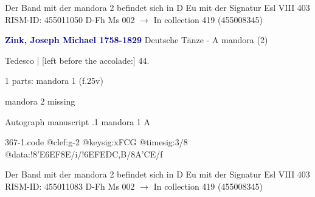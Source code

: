 \documentclass[twocolumn]{book}
\begin{document}
\newline Der Band mit der mandora 2 befindet sich in D Eu mit der Signatur Esl VIII 403
\newline RISM-ID: 455011050
\newline D-Fh  Ms 002
\newline $\rightarrow$ In collection 419 (455008345)
      
\newline \par \vspace{7pt} \textcolor{darkblue}{\textbf{Zink, Joseph Michael  1758-1829}}
\newline Deutsche Tänze - A
\newline mandora (2)
\newline \begin{itshape}[f.25v, at left:] Tedesco | [left before the accolade:] 44.\end{itshape} 
\newline \textcolor{darkblue}{}  1 parts: mandora 1  (f.25v)
\newline \begin{small} mandora 2 missing\end{small} 
\newline Autograph manuscript
.1  mandora 1  A  
\begin{filecontents*}{367-1.code}
@clef:g-2
@keysig:xFCG
@timesig:3/8
@data:!{8'E6EF}8E/i/!{6EF}{ED}{C,B}/8A'CE/f
\end{filecontents*}
\newline
%

\newline Der Band mit der mandora 2 befindet sich in D Eu mit der Signatur Esl VIII 403
\newline RISM-ID: 455011083
\newline D-Fh  Ms 002
\newline $\rightarrow$ In collection 419 (455008345)
      
\end{document}
